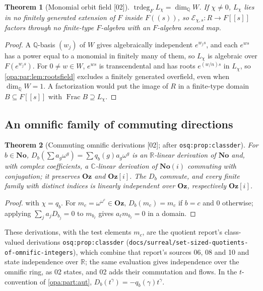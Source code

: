\documentclass[11pt,oneside]{article}
\numberwithin{equation}{section}
\newtheorem{theorem}{Theorem}[section]
\theoremstyle{definition}
\theoremstyle{remark}
\newcommand{\No}{\mathbf{No}}
\newcommand{\Oz}{\mathbf{Oz}}
\newcommand{\Og}{\mathbf{Oz}[i]}
\newcommand{\SC}{\mathbf{No}(i)}
\newcommand{\R}{\mathbb R}
\newcommand{\C}{\mathbb C}
\newcommand{\Q}{\mathbb Q}
\newcommand{\EE}{\mathcal E}
\newcommand{\Frac}{\operatorname{Frac}}
\newcommand{\trdeg}{\operatorname{trdeg}}
\newcommand{\src}[1]{\textup{\textsf{\small[#1]}}}
\newcommand{\lbl}[1]{\nolinkurl{#1}}
\newcommand{\fn}[1]{\nolinkurl{#1}}
\begin{document}
\begin{theorem}[Monomial orbit field \src{02}]\label{opa:par:thm:orbitfield}
$\trdeg_FL_\chi=\dim_\Q W$. If $\chi\ne0$, $L_\chi$ lies in no finitely generated
extension of $F$ inside $F((s))$, so $\EE_{\chi,s}:R\to F[[s]]$ factors through no
finite-type $F$-algebra with an $F$-algebra second map.
\end{theorem}
\begin{proof}
A $\Q$-basis $(w_j)$ of $W$ gives algebraically independent $e^{w_js}$, and each $e^{ws}$
has a power equal to a monomial in finitely many of them, so $L_\chi$ is algebraic over
$F(e^{w_js})$. For $0\ne w\in W$, $e^{ws}$ is transcendental and has roots $e^{(w/n)s}$ in
$L_\chi$, so \cref{opa:par:lem:rootsfield} excludes a finitely generated overfield, even
when $\dim_\Q W=1$. A factorization would put the image of $R$ in a finite-type domain
$B\subseteq F[[s]]$ with $\Frac B\supseteq L_\chi$.
\end{proof}

\subsection{An omnific family of commuting directions}

\begin{theorem}[Commuting omnific derivations \src{02}; after \lbl{osq:prop:classder}]\label{opa:par:thm:Db}
For $b\in\No$, $D_b(\sum a_g\omega^g)=\sum q_b(g)a_g\omega^g$ is an $\R$-linear derivation
of $\No$ and, with complex coefficients, a $\C$-linear derivation of $\SC$ commuting
with conjugation; it preserves $\Oz$ and $\Og$. The $D_b$ commute, and every finite
family with distinct indices is linearly independent over $\Oz$, respectively $\Og$.
\end{theorem}
\begin{proof}
 with $\chi=q_b$. For $m_c=\omega^{\omega^c}\in\Oz$,
$D_b(m_c)=m_c$ if $b=c$ and $0$ otherwise; applying $\sum_ja_jD_{b_j}=0$ to $m_{b_\ell}$
gives $a_\ell m_{b_\ell}=0$ in a domain.
\end{proof}

These derivations, with the test elements $m_c$, are the quotient report's
class-valued derivations \lbl{osq:prop:classder}
(\fn{docs/surreal/set-sized-quotients-of-omnific-integers}), which combine that report's
sources 06, 08 and 10 and state independence over $\R$; the same evaluation gives
independence over the omnific ring, as 02 states, and 02 adds their commutation and
flows. In the $t$-convention of \cref{opa:part:aut}, $D_b(t^\gamma)=-q_b(\gamma)t^\gamma$.
\end{document}
